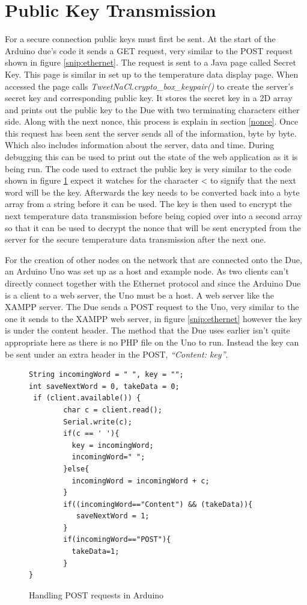 \section{Public Key Transmission}
\label{pktransmit}

For a secure connection public keys must first be sent. At the start of the Arduino due's code it sends a GET request, very similar to the POST request shown in figure \ref{snip:ethernet}. The request is sent to a Java page called Secret Key. This page is similar in set up to the temperature data display page. When accessed the page calls \emph{TweetNaCl.crypto\_box\_keypair()} to create the server's secret key and corresponding public key. It stores the secret key in a 2D array and prints out the public key to the Due with two terminating characters either side. Along with the next nonce, this process is explain in section \ref{nonce}. Once this request has been sent the server sends all of the information, byte by byte. Which also includes information about the server, data and time. During debugging this can be used to print out the state of the web application as it is being run. The code used to extract the public key is very similar to the code shown in figure \ref{snip:post} expect it watches for the character < to signify that the next word will be the key. Afterwards the key needs to be converted back into a byte array from a string before it can be used. The key is then used to encrypt the next temperature data transmission before being copied over into a second array so that it can be used to decrypt the nonce that will be sent encrypted from the server for the secure temperature data transmission after the next one. 

For the creation of other nodes on the network that are connected onto the Due, an Arduino Uno was set up as a host and example node. As two clients can't directly connect together with the Ethernet protocol and since the Arduino Due is a client to a web server, the Uno must be a host. A web server like the XAMPP server.
The Due sends a POST request to the Uno, very similar to the one it sends to the XAMPP web server, in figure \ref{snip:ethernet} however the key is under the content header. The method that the Due uses earlier isn't quite appropriate here as there is no PHP file on the Uno to run. Instead the key can be sent under an extra header in the POST, \emph{``Content: key''}.

\begin{figure}[H]
\begin{lstlisting}[style=Arduino]
String incomingWord = " ", key = "";
int saveNextWord = 0, takeData = 0;
 if (client.available()) {
        char c = client.read();
        Serial.write(c);
        if(c == ' '){
          key = incomingWord;
          incomingWord=" ";
        }else{
          incomingWord = incomingWord + c;
        }
        if((incomingWord=="Content") && (takeData)){
           saveNextWord = 1; 
        }
        if(incomingWord=="POST"){
          takeData=1;
        }
}
\end{lstlisting}
\caption{Handling POST requests in Arduino}
\label{snip:post}
\end{figure}

